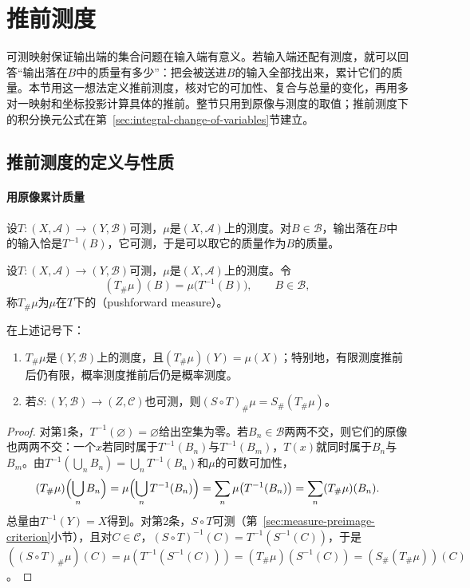 \section{推前测度}
\label{sec:measure-pushforward}

可测映射保证输出端的集合问题在输入端有意义。若输入端还配有测度，就可以回答“输出落在$B$中的质量有多少”：把会被送进$B$的输入全部找出来，累计它们的质量。本节用这一想法定义推前测度，核对它的可加性、复合与总量的变化，再用多对一映射和坐标投影计算具体的推前。整节只用到原像与测度的取值；推前测度下的积分换元公式在第~\ref{sec:integral-change-of-variables}节建立。

\subsection{推前测度的定义与性质}
\label{sec:measure-pushforward-def}

\paragraph{用原像累计质量}
设$T:(X,\mathcal A)\to(Y,\mathcal B)$可测，$\mu$是$(X,\mathcal A)$上的测度。对$B\in\mathcal B$，输出落在$B$中的输入恰是$T^{-1}(B)$，它可测，于是可以取它的质量作为$B$的质量。

\begin{definition}[推前测度]
\label{def:measure-pushforward}
设$T:(X,\mathcal A)\to(Y,\mathcal B)$可测，$\mu$是$(X,\mathcal A)$上的测度。令
\[
 (T_\#\mu)(B)=\mu\bigl(T^{-1}(B)\bigr),\qquad B\in\mathcal B,
\]
称$T_\#\mu$为$\mu$在$T$下的（pushforward measure）。
\end{definition}

\begin{theorem}[推前测度的基本性质]
\label{thm:measure-pushforward-properties}
在上述记号下：
\begin{enumerate}
 \item $T_\#\mu$是$(Y,\mathcal B)$上的测度，且$(T_\#\mu)(Y)=\mu(X)$；特别地，有限测度推前后仍有限，概率测度推前后仍是概率测度。
 \item 若$S:(Y,\mathcal B)\to(Z,\mathcal C)$也可测，则$(S\circ T)_\#\mu=S_\#(T_\#\mu)$。
\end{enumerate}
\end{theorem}

\begin{proof}
对第1条，$T^{-1}(\varnothing)=\varnothing$给出空集为零。若$B_n\in\mathcal B$两两不交，则它们的原像也两两不交：一个$x$若同时属于$T^{-1}(B_n)$与$T^{-1}(B_m)$，$T(x)$就同时属于$B_n$与$B_m$。由$T^{-1}(\bigcup_nB_n)=\bigcup_nT^{-1}(B_n)$和$\mu$的可数可加性，
\[
 (T_\#\mu)\Bigl(\bigcup_nB_n\Bigr)=\mu\Bigl(\bigcup_nT^{-1}(B_n)\Bigr)=\sum_n\mu\bigl(T^{-1}(B_n)\bigr)=\sum_n(T_\#\mu)(B_n).
\]
总量由$T^{-1}(Y)=X$得到。对第2条，$S\circ T$可测（第~\ref{sec:measure-preimage-criterion}小节），且对$C\in\mathcal C$，$(S\circ T)^{-1}(C)=T^{-1}(S^{-1}(C))$，于是$((S\circ T)_\#\mu)(C)=\mu(T^{-1}(S^{-1}(C)))=(T_\#\mu)(S^{-1}(C))=(S_\#(T_\#\mu))(C)$。
\end{proof}


